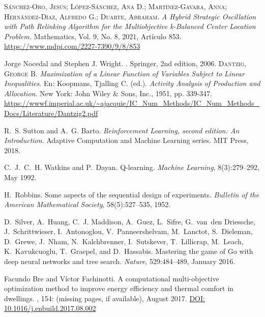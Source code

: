 \documentclass[12pt,a4paper]{book}
\begin{document}
\begin{thebibliography}{X}
     \textsc{Sánchez-Oro, Jesús; López-Sánchez, Ana D.; Martínez-Gavara, Anna; Hernández-Díaz, Alfredo G.; Duarte, Abraham}. \textit{A Hybrid Strategic Oscillation with Path Relinking Algorithm for the Multiobjective k-Balanced Center Location Problem.} Mathematics, Vol. 9, No. 8, 2021, Artículo 853. \url{https://www.mdpi.com/2227-7390/9/8/853}

    Jorge Nocedal and Stephen J. Wright.
    .
    \newblock Springer, 2nd edition, 2006.
     \textsc{Dantzig, George B.} \textit{Maximization of a Linear Function of Variables Subject to Linear Inequalities.} En: Koopmans, Tjalling C. (ed.). \textit{Activity Analysis of Production and Allocation}. New York: John Wiley \& Sons, Inc., 1951, pp. 339-347. \url{https://wwwf.imperial.ac.uk/~ajacquie/IC_Num_Methods/IC_Num_Methods_Docs/Literature/Dantzig2.pdf}


    R.~S. Sutton and A.~G. Barto.
    \newblock \textit{Reinforcement Learning, second edition: An Introduction}.
    \newblock Adaptive Computation and Machine Learning series. MIT Press, 2018.

    C.~J.~C.~H. Watkins and P.~Dayan.
    \newblock Q-learning.
    \newblock \textit{Machine Learning}, 8(3):279--292, May 1992.

    H.~Robbins.
    \newblock Some aspects of the sequential design of experiments.
    \newblock \textit{Bulletin of the American Mathematical Society}, 58(5):527--535, 1952.
        
    D.~Silver, A.~Huang, C.~J. Maddison, A.~Guez, L.~Sifre, G.~van~den Driessche, J.~Schrittwieser, I.~Antonoglou, V.~Panneershelvam, M.~Lanctot, S.~Dieleman, D.~Grewe, J.~Nham, N.~Kalchbrenner, I.~Sutskever, T.~Lillicrap, M.~Leach, K.~Kavukcuoglu, T.~Graepel, and D.~Hassabis.
    \newblock Mastering the game of Go with deep neural networks and tree search.
    \newblock \textit{Nature}, 529:484--489, January 2016.

    Facundo Bre and Víctor Fachinotti.
    \newblock A computational multi-objective optimization method to improve energy efficiency and thermal comfort in dwellings.
    , 154: (missing pages, if available), August 2017.
    \newblock \href{https://doi.org/10.1016/j.enbuild.2017.08.002}{DOI: 10.1016/j.enbuild.2017.08.002}
    

\end{thebibliography}
\end{document}

